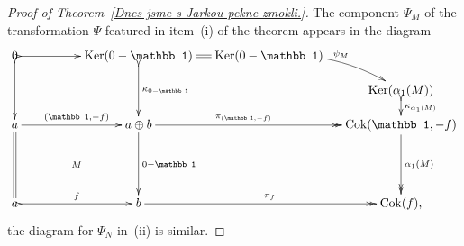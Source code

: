 \documentclass[12pt,leqno]{amsart}
\theoremstyle{definition}
\def\Coker{{\rm Cok}}
\def\Ker{{\rm Ker}}
\def\id{{\mathbb 1}}
\newcommand{\4}{\texttt{4}}
\begin{document}
\begin{proof}[Proof of Theorem~\ref{Dnes jsme s Jarkou pekne zmokli.}]
The component $\Psi_M$ of the transformation $\Psi$ featured in
item~(i) of the theorem appears in the diagram
\begin{equation}
\label{inj}
\xymatrix@R=1.2em@C=1.2em{0\ar@{>->}[rrr] \ar@{>->}[dd]  &&&
  \ar@{>->}[dd]^{\kappa_{0-\id}} \Ker(0-\id)  \ar@{=}[r]   
& \Ker(0-\id)   \ar@/^1em/[rd]^{\psi_M}
\\
&&&&& \Ker(\alpha_1(M)) \ar@{>->}[d]^(.5){\kappa_{\alpha_1(M)}}
\\
a \ar[rrr]^{(\id,-f)} \ar@{=}[ddd]  
&&& \ar[ddd]^{0-\id} a\oplus b \ar@{->>}[rr]^(.4){\pi_{(\id,-f)}}  
&& \Coker(\id,-f)\ar@{->>}[ddd]^{\alpha_1(M)}
\\
\\
\\
a \ar@{>->}[rrr]^f &&& b\ar@{->>}[rr]^{\pi_f}  \ar@{}[llluuu]|M   
&& \Coker(f),
}
\end{equation}
the diagram for $\Psi_N$ in~(ii) is similar.  


\end{proof}
\end{document}
